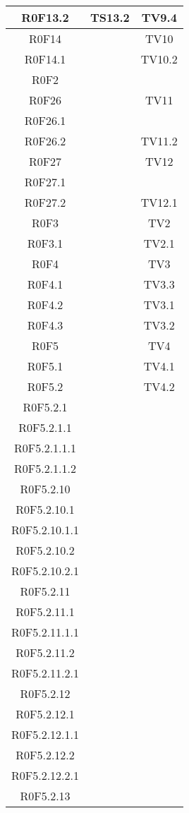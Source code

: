 \begin{center}
\begin{longtable}{|c|c|c|}
\hline
R0F13.2 & TS13.2  & TV9.4 \\
\hline
R0F14 &  & TV10 \\
\hline
R0F14.1 &  & TV10.2 \\
\hline
R0F2 &  &  \\
\hline
R0F26 &  & TV11 \\
\hline
R0F26.1 &  &  \\
\hline
R0F26.2 &  & TV11.2 \\
\hline
R0F27 &  & TV12 \\
\hline
R0F27.1 &  &  \\
\hline
R0F27.2 &  & TV12.1 \\
\hline
R0F3 &  & TV2 \\
\hline
R0F3.1 &  & TV2.1 \\
\hline
R0F4 &  & TV3 \\
\hline
R0F4.1 &  & TV3.3 \\
\hline
R0F4.2 &  & TV3.1 \\
\hline
R0F4.3 &  & TV3.2 \\
\hline
R0F5 &  & TV4 \\
\hline
R0F5.1 &  & TV4.1 \\
\hline
R0F5.2 &  & TV4.2 \\
\hline
R0F5.2.1 &  &  \\
\hline
R0F5.2.1.1 &  &  \\
\hline
R0F5.2.1.1.1 &  &  \\
\hline
R0F5.2.1.1.2 &  &  \\
\hline
R0F5.2.10 &  &  \\
\hline
R0F5.2.10.1 &  &  \\
\hline
R0F5.2.10.1.1 &  &  \\
\hline
R0F5.2.10.2 &  &  \\
\hline
R0F5.2.10.2.1 &  &  \\
\hline
R0F5.2.11 &  &  \\
\hline
R0F5.2.11.1 &  &  \\
\hline
R0F5.2.11.1.1 &  &  \\
\hline
R0F5.2.11.2 &  &  \\
\hline
R0F5.2.11.2.1 &  &  \\
\hline
R0F5.2.12 &  &  \\
\hline
R0F5.2.12.1 &  &  \\
\hline
R0F5.2.12.1.1 &  &  \\
\hline
R0F5.2.12.2 &  &  \\
\hline
R0F5.2.12.2.1 &  &  \\
\hline
R0F5.2.13 &  &  \\

\end{longtable}
\end{center}
